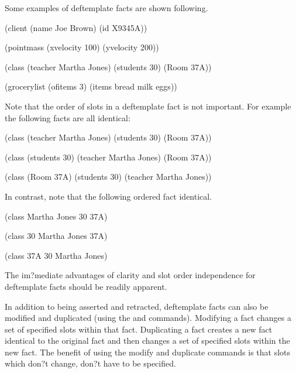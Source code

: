 \documentclass[letterpaper,10pt,english]{sphinxmanual}
\begin{document}
Some examples of deftemplate facts are shown following.

\begin{sphinxVerbatim}[commandchars=\\\{\}]
(client (name \PYGZdq{}Joe Brown\PYGZdq{}) (id X9345A))

(point\PYGZhy{}mass (x\PYGZhy{}velocity 100) (y\PYGZhy{}velocity \PYGZhy{}200))

(class (teacher \PYGZdq{}Martha Jones\PYGZdq{}) (\PYGZsh{}\PYGZhy{}students 30) (Room \PYGZdq{}37A\PYGZdq{}))

(grocery\PYGZhy{}list (\PYGZsh{}\PYGZhy{}of\PYGZhy{}items 3) (items bread milk eggs))
\end{sphinxVerbatim}

Note that the order of slots in a deftemplate fact is not important. For
example the following facts are all identical:

\begin{sphinxVerbatim}[commandchars=\\\{\}]
(class (teacher \PYGZdq{}Martha Jones\PYGZdq{}) (\PYGZsh{}\PYGZhy{}students 30) (Room \PYGZdq{}37A\PYGZdq{}))

(class (\PYGZsh{}\PYGZhy{}students 30) (teacher \PYGZdq{}Martha Jones\PYGZdq{}) (Room \PYGZdq{}37A\PYGZdq{}))

(class (Room \PYGZdq{}37A\PYGZdq{}) (\PYGZsh{}\PYGZhy{}students 30) (teacher \PYGZdq{}Martha Jones\PYGZdq{}))
\end{sphinxVerbatim}

In contrast, note that the following ordered fact  identical.

\begin{sphinxVerbatim}[commandchars=\\\{\}]
(class \PYGZdq{}Martha Jones\PYGZdq{} 30 \PYGZdq{}37A\PYGZdq{})

(class 30 \PYGZdq{}Martha Jones\PYGZdq{} \PYGZdq{}37A\PYGZdq{})

(class \PYGZdq{}37A\PYGZdq{} 30 \PYGZdq{}Martha Jones\PYGZdq{})
\end{sphinxVerbatim}

The im?mediate advantages of clarity and slot order independence for
deftemplate facts should be readily apparent.

In addition to being asserted and retracted, deftemplate facts can also
be modified and duplicated (using the  and 
commands). Modifying a fact changes a set of specified slots within that
fact. Duplicating a fact creates a new fact identical to the original
fact and then changes a set of specified slots within the new fact. The
benefit of using the modify and duplicate commands is that slots which
don?t change, don?t have to be specified.
\end{document}
